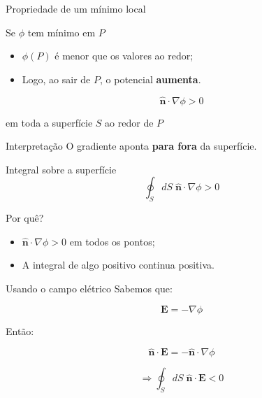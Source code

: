 \documentclass[aspectratio=169,11pt]{beamer}
\begin{document}
\begin{frame}{Propriedade de um mínimo local}
\begin{block}{Se $\phi$ tem mínimo em $P$}
\begin{itemize}
\item $\phi(P)$ é menor que os valores ao redor;
\item Logo, ao sair de $P$, o potencial \textbf{aumenta}.
\end{itemize}
\end{block}

\pause

\begin{equation}
\hat{\mathbf n}\cdot \nabla \phi > 0
\end{equation}

\begin{center}
em toda a superfície $S$ ao redor de $P$
\end{center}

\pause

\begin{alertblock}{Interpretação}
O gradiente aponta \textbf{para fora} da superfície.
\end{alertblock}
\end{frame}

\begin{frame}{Integral sobre a superfície}
\begin{equation}
\oint_S dS \; \hat{\mathbf n} \cdot \nabla \phi > 0
\tag{3.21}
\end{equation}

\pause

\begin{block}{Por quê?}
\begin{itemize}
\item $\hat{\mathbf n} \cdot \nabla \phi > 0$ em todos os pontos;
\item A integral de algo positivo continua positiva.
\end{itemize}
\end{block}
\end{frame}

\begin{frame}{Usando o campo elétrico}
Sabemos que:

\begin{equation}
\mathbf E = -\nabla \phi
\end{equation}

\pause

Então:

\begin{equation}
\hat{\mathbf n}\cdot \mathbf E = -\hat{\mathbf n}\cdot \nabla \phi
\end{equation}

\pause

\begin{equation}
\Rightarrow
\oint_S dS \; \hat{\mathbf n}\cdot \mathbf E < 0
\end{equation}
\end{frame}
\end{document}
